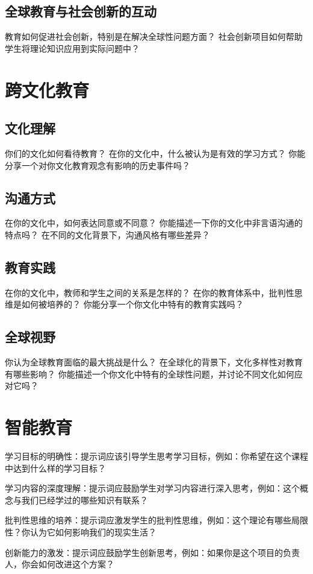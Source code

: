 \documentclass[12pt]{book}
\begin{document}
\subsection{全球教育与社会创新的互动}
教育如何促进社会创新，特别是在解决全球性问题方面？
社会创新项目如何帮助学生将理论知识应用到实际问题中？

\section{跨文化教育}
\subsection{文化理解}
你们的文化如何看待教育？
在你的文化中，什么被认为是有效的学习方式？
你能分享一个对你文化教育观念有影响的历史事件吗？

\subsection{沟通方式}
在你的文化中，如何表达同意或不同意？
你能描述一下你的文化中非言语沟通的特点吗？
在不同的文化背景下，沟通风格有哪些差异？

\subsection{教育实践}
在你的文化中，教师和学生之间的关系是怎样的？
在你的教育体系中，批判性思维是如何被培养的？
你能分享一个你文化中特有的教育实践吗？

\subsection{全球视野}
你认为全球教育面临的最大挑战是什么？
在全球化的背景下，文化多样性对教育有哪些影响？
你能描述一个你文化中特有的全球性问题，并讨论不同文化如何应对它吗？

\section{智能教育}

学习目标的明确性：提示词应该引导学生思考学习目标，例如：你希望在这个课程中达到什么样的学习目标？

学习内容的深度理解：提示词应鼓励学生对学习内容进行深入思考，例如：这个概念与我们已经学过的哪些知识有联系？

批判性思维的培养：提示词应激发学生的批判性思维，例如：这个理论有哪些局限性？你认为它如何影响我们的现实生活？

创新能力的激发：提示词应鼓励学生创新思考，例如：如果你是这个项目的负责人，你会如何改进这个方案？
\end{document}
